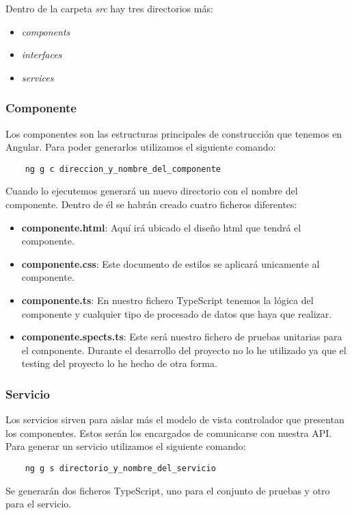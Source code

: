 Dentro de la carpeta \textit{src} hay tres directorios más:
\begin{itemize}
    \item \textit{components}
    \item \textit{interfaces}
    \item \textit{services}
\end{itemize}

\subsubsection{Componente}
Los componentes son las estructuras principales de construcción que tenemos en Angular. Para poder generarlos utilizamos el siguiente comando:
\begin{verbatim}
    ng g c direccion_y_nombre_del_componente
\end{verbatim}
Cuando lo ejecutemos generará un nuevo directorio con el nombre del componente. Dentro de él se habrán creado cuatro ficheros diferentes:
\begin{itemize}
    \item \textbf{componente.html}: Aquí irá ubicado el diseño html que tendrá el componente.
    \item \textbf{componente.css}: Este documento de estilos se aplicará unicamente al componente.
    \item \textbf{componente.ts}: En nuestro fichero TypeScript tenemos la lógica del componente y cualquier tipo de procesado de datos que haya que realizar.
    \item \textbf{componente.spects.ts}: Este será nuestro fichero de pruebas unitarias para el componente. Durante el desarrollo del proyecto no lo he utilizado ya que el testing del proyecto lo he hecho de otra forma.
\end{itemize}

\subsubsection{Servicio}
Los servicios sirven para aislar más el modelo de vista controlador que presentan los componentes. Estos serán los encargados de comunicarse con nuestra API.
\\Para generar un servicio utilizamos el siguiente comando:
\begin{verbatim}
    ng g s directorio_y_nombre_del_servicio
\end{verbatim}
Se generarán dos ficheros TypeScript, uno para el conjunto de pruebas y otro para el servicio.

